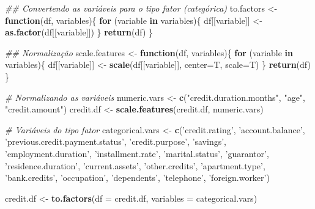 \documentclass[
]{article}
\newenvironment{Shaded}{\begin{snugshade}}{\end{snugshade}}
\newcommand{\CommentTok}[1]{\textcolor[rgb]{0.56,0.35,0.01}{\textit{#1}}}
\newcommand{\ControlFlowTok}[1]{\textcolor[rgb]{0.13,0.29,0.53}{\textbf{#1}}}
\newcommand{\DataTypeTok}[1]{\textcolor[rgb]{0.13,0.29,0.53}{#1}}
\newcommand{\KeywordTok}[1]{\textcolor[rgb]{0.13,0.29,0.53}{\textbf{#1}}}
\newcommand{\NormalTok}[1]{#1}
\newcommand{\StringTok}[1]{\textcolor[rgb]{0.31,0.60,0.02}{#1}}
\begin{document}
\begin{Shaded}
\begin{Highlighting}[]
\CommentTok{## Convertendo as variáveis para o tipo fator (categórica)}
\NormalTok{to.factors <-}\StringTok{ }\ControlFlowTok{function}\NormalTok{(df, variables)\{}
  \ControlFlowTok{for}\NormalTok{ (variable }\ControlFlowTok{in}\NormalTok{ variables)\{}
\NormalTok{    df[[variable]] <-}\StringTok{ }\KeywordTok{as.factor}\NormalTok{(df[[variable]])}
\NormalTok{  \}}
  \KeywordTok{return}\NormalTok{(df)}
\NormalTok{\}}

\CommentTok{## Normalização}
\NormalTok{scale.features <-}\StringTok{ }\ControlFlowTok{function}\NormalTok{(df, variables)\{}
  \ControlFlowTok{for}\NormalTok{ (variable }\ControlFlowTok{in}\NormalTok{ variables)\{}
\NormalTok{    df[[variable]] <-}\StringTok{ }\KeywordTok{scale}\NormalTok{(df[[variable]], }\DataTypeTok{center=}\NormalTok{T, }\DataTypeTok{scale=}\NormalTok{T)}
\NormalTok{  \}}
  \KeywordTok{return}\NormalTok{(df)}
\NormalTok{\}}

\CommentTok{# Normalizando as variáveis}
\NormalTok{numeric.vars <-}\StringTok{ }\KeywordTok{c}\NormalTok{(}\StringTok{"credit.duration.months"}\NormalTok{, }\StringTok{"age"}\NormalTok{, }\StringTok{"credit.amount"}\NormalTok{)}
\NormalTok{credit.df <-}\StringTok{ }\KeywordTok{scale.features}\NormalTok{(credit.df, numeric.vars)}

\CommentTok{# Variáveis do tipo fator}
\NormalTok{categorical.vars <-}\StringTok{ }\KeywordTok{c}\NormalTok{(}\StringTok{'credit.rating'}\NormalTok{, }\StringTok{'account.balance'}\NormalTok{, }\StringTok{'previous.credit.payment.status'}\NormalTok{,}
                      \StringTok{'credit.purpose'}\NormalTok{, }\StringTok{'savings'}\NormalTok{, }\StringTok{'employment.duration'}\NormalTok{, }\StringTok{'installment.rate'}\NormalTok{,}
                      \StringTok{'marital.status'}\NormalTok{, }\StringTok{'guarantor'}\NormalTok{, }\StringTok{'residence.duration'}\NormalTok{, }\StringTok{'current.assets'}\NormalTok{,}
                      \StringTok{'other.credits'}\NormalTok{, }\StringTok{'apartment.type'}\NormalTok{, }\StringTok{'bank.credits'}\NormalTok{, }\StringTok{'occupation'}\NormalTok{, }
                      \StringTok{'dependents'}\NormalTok{, }\StringTok{'telephone'}\NormalTok{, }\StringTok{'foreign.worker'}\NormalTok{)}

\NormalTok{credit.df <-}\StringTok{ }\KeywordTok{to.factors}\NormalTok{(}\DataTypeTok{df =}\NormalTok{ credit.df, }\DataTypeTok{variables =}\NormalTok{ categorical.vars)}
\end{Highlighting}
\end{Shaded}
\end{document}
